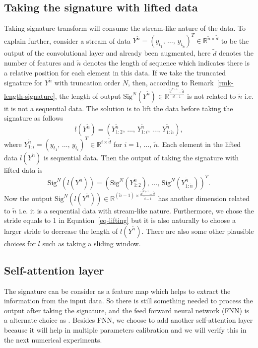 \documentclass[]{article}
\renewcommand{\(}{\left(}
\renewcommand{\)}{\right)}
\begin{document}
	\subsection{Taking the signature with lifted data}\label{subsec-lifting-layer}
	Taking signature transform will consume the stream-like nature of the data. To explain further, consider a stream of data $Y^{\widetilde{n}}={(y_{t_1},\,\ldots,\,y_{t_{\widetilde{n}}})}^T\in\mathbb{R}^{\widetilde{n}\times\widetilde{d}}$ to be the output of the convolutional layer and already been augmented, here $\widetilde{d}$ denotes the number of features and $\widetilde{n}$ denotes the length of sequence which indicates there is a relative position for each element in this data. If we take the truncated signature for $Y^{\widetilde{n}}$ with truncation order $N$, then, according to Remark~\ref{rmk-length-signature}, the length of output $\text{Sig}^N(Y^{\widetilde{n}})\in\mathbb{R}^{\frac{\widetilde{d}^{N+1}-\widetilde{d}}{\widetilde{d}-1}}$ is not related to $\widetilde{n}$ i.e. it is not a sequential data. The solution is to lift the data before taking the signature as follows
	\begin{equation}
		\label{eq-lifting}
		l(Y^{\widetilde{n}})=(Y^{\widetilde{n}}_{1:2},\,\ldots,\,Y^{\widetilde{n}}_{1:i},\,\ldots,\,Y^{\widetilde{n}}_{1:\widetilde{n}}),
	\end{equation}
	where $Y^{\widetilde{n}}_{1:i}={(y_{t_1},\,\ldots,\,y_{t_i})}^T\in\mathbb{R}^{i\times\widetilde{d}}$ for $i=1,\,\ldots,\,\widetilde{n}$. Each element in the lifted data $l(Y^{\widetilde{n}})$ is sequential data. Then the output of taking the signature with lifted data is
	\begin{equation}
		\text{Sig}^N(l(Y^{\widetilde{n}}))={(\text{Sig}^N(Y^{\widetilde{n}}_{1:2}),\,\ldots,\,\text{Sig}^N(Y^{\widetilde{n}}_{1:\widetilde{n}}))}^T.
	\end{equation}
	Now the output $\text{Sig}^N(l(Y^{\widetilde{n}}))\in\mathbb{R}^{(\widetilde{n}-1)\times\frac{\widetilde{d}^{N+1}-\widetilde{d}}{\widetilde{d}-1}}$ has another dimension related to $\widetilde{n}$ i.e. it is a sequential data with stream-like nature. Furthermore, we chose the stride equals to 1 in Equation~\eqref{eq-lifting} but it is also naturally to choose a larger stride to decrease the length of $l(Y^{\widetilde{n}})$. There are also some other plausible choices for $l$ such as taking a sliding window.
	
	\subsection{Self-attention layer}\label{subsec-transformer-layer}
	The signature can be consider as a feature map which helps to extract the information from the input data. So there is still something needed to process the output after taking the signature, and the feed forward neural network (FNN) is a alternate choice as \cite{Lyons_2019_DeepSignature}. Besides FNN, we choose to add another self-attention layer because it will help in multiple parameters calibration and we will verify this in the next numerical experiments. 
	
\end{document}

